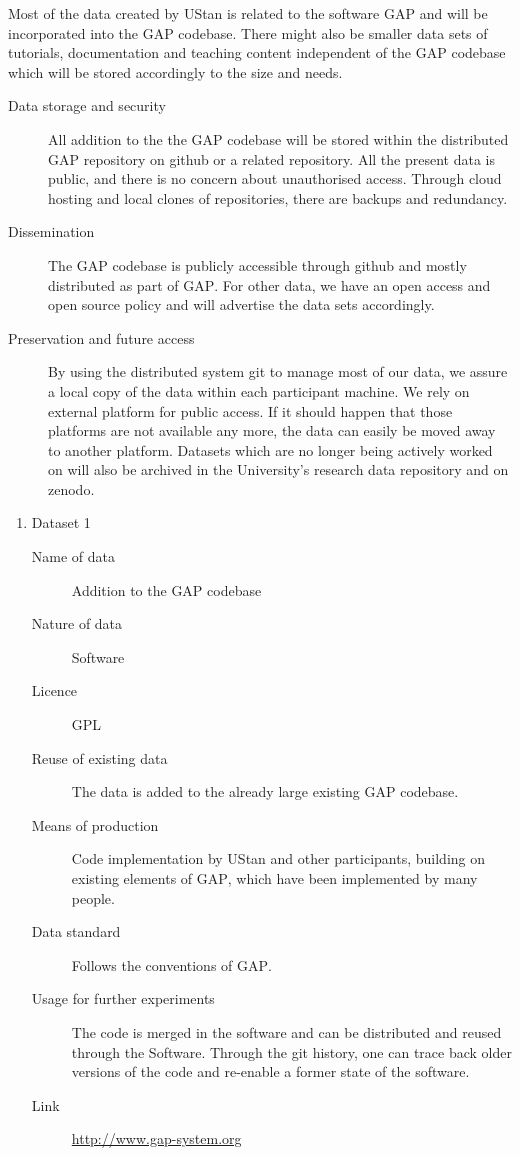 \documentclass[12pt]{article}
\newcommand{\software}[1]{\textsc{#1}\xspace}
\newcommand{\GAP}{\software{GAP}}
\begin{document}
Most of the data created by UStan is related to the software \GAP and
will be incorporated into the \GAP codebase. There might also be
smaller data sets of tutorials, documentation and teaching content
independent of the \GAP codebase which will be stored accordingly to
the size and needs.
\begin{description}
\item[Data storage and security] All addition to the the \GAP
  codebase will be stored within the distributed \GAP repository on
  github or a related repository. All the present data is
  public, and there is no concern about unauthorised access. Through
  cloud hosting and local clones of repositories, there are backups
  and redundancy.
\item[Dissemination] The \GAP codebase is publicly accessible through
  github and mostly distributed as part of \GAP.
  For other data, we have an open access and open source policy and will advertise the data sets accordingly.

\item[Preservation and future access] By using the distributed system
  git to manage most of our data, we assure a local copy of the data
  within each participant machine. We rely on external platform for public access. If it should happen that those
  platforms are not available any more, the data can easily be moved
  away to another platform. Datasets which are no longer being
  actively worked on will also be archived in the University's
  research data repository and on zenodo.
\end{description}


\begin{enumerate}





\item {Dataset 1}


\begin{description}
\item[Name of data] Addition to the \GAP codebase
\item[Nature of data] Software
\item[Licence] GPL
\item[Reuse of existing data] The data is added to the already large existing \GAP codebase.
\item[Means of production] Code implementation by UStan and other
  participants, building on existing elements of \GAP, which have been
  implemented by many people.
\item[Data standard] Follows the conventions of \GAP.
\item [Usage for further experiments] The code is merged in the software and can be distributed and reused through the Software. Through the git history,
one can trace back older versions of the code and re-enable a former state of the software.
\item [Link] \href{http://www.gap-system.org}{http://www.gap-system.org}
\end{description}

%
%
\end{enumerate}
\end{document}
